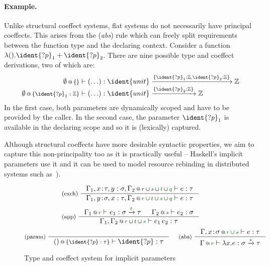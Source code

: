 \paragraph{Example.} Unlike structural coeffect systems, flat systems
do not necessarily have principal coeffects. 
This arises from the (\emph{abs}) rule which can freely split
requirements between the function type and the declaring
context. Consider a function %
$\lambda ().\ident{?p}_1 + \ident{?p}_2$.  There are nine possible 
 type and coeffect derivations, two of which are:
\[
\begin{array}{rl}
\coctx{\emptyset}{ \{  \} } &\hspace{-0.7em}\vdash (\ldots) : 
  \ident{unit} \xrightarrow{ \{ \ident{?p}_1:\mathbb{Z}, \ident{?p}_2:\mathbb{Z} \} } \mathbb{Z}
\\
\coctx{\emptyset}{ \{ \ident{?p}_1:\mathbb{Z} \} } &\hspace{-0.7em} \vdash (\ldots) : 
  \ident{unit} \xrightarrow{ \{ \ident{?p}_2:\mathbb{Z} \} } \mathbb{Z}
\end{array}
\]
In the first case, both parameters are dynamically scoped and have to be provided by the caller.
In the second case, the parameter $\ident{?p}_1$ is available in the declaring scope and so it is
(lexically) captured.

Although structural coeffects have more desirable syntactic properties, we aim to capture this
non-principality too as it is practically useful -- Haskell's implicit parameters use it and
it can be used to model resource rebinding in distributed systems such as~\cite{app-distributed-acute}).


\begin{figure}
\[
\tyrule{exch}
  {\coctx{\Gamma_1,x\!:\!\tau,y:\sigma,\Gamma_2}{r \cup \cclrd{s} \cup \cclrd{t} \cup \cclrd{q}} \vdash e : \tau}
  {\coctx{\Gamma_1,y\!:\!\sigma,x:\tau,\Gamma_2}{\cclrd{r} \cup \cclrd{t} \cup \cclrd{s} \cup \cclrd{q}} \vdash e : \tau}
\]
\[
\tyrule{app}
  { \coctx{\Gamma_1}{\cclrd{r}} \vdash e_1 : \sigma \xrightarrow{\cclrd{t}} \tau &
    \coctx{\Gamma_2}{\cclrd{s}} \vdash e_2 : \sigma }
  { \coctx{\Gamma_1, \Gamma_2}{\cclrd{r} \cup \cclrd{t} \cup \cclrd{s}} \vdash e_1 \, e_2 : \tau} 
\]
\[
\tyrule{param}{}
  {\coctx{()}{ \{ \ident{?p}:\tau \} } \vdash \ident{?p} : \tau}
\quad\;
\tyrule{abs}
  {\coctx{\Gamma, x \!:\! \sigma}{\cclrd{r} \cup \cclrd{s}} \vdash e : \tau}
  {\coctx{\Gamma}{\cclrd{r}} \vdash \lambda x . e : \sigma \xrightarrow{\cclrd{s}} \tau}
\]
\vspace{-0.5em}
\caption{Type and coeffect system for implicit parameters}
\label{fig:implpar-coeff}
\end{figure}

